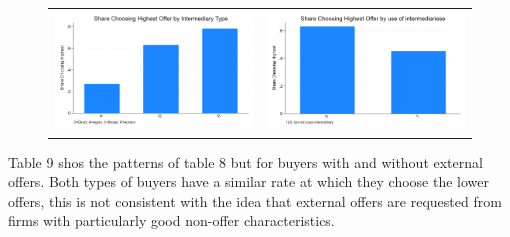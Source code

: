 \documentclass[12pt]{article}
\begin{document}
\begin{figure}[H]
\caption{}
 \label{fig:ie4_11}
\centering{}%
\begin{tabular}{cc}
\includegraphics[scale=0.17]{figures/IE4/IE4_highest_by_intermediary_type.png} 
& \includegraphics[scale=0.17]{figures/IE4/IE4_highest_by_intermediary_type(2).png} 
\end{tabular}
\end{figure} 
 
Table 9 shos the patterns of table 8 but for buyers with and without external offers. Both types of buyers have a similar rate at which they choose the lower offers, this is not consistent with the idea that external offers are requested from firms with particularly good non-offer characteristics. 


\end{document}
